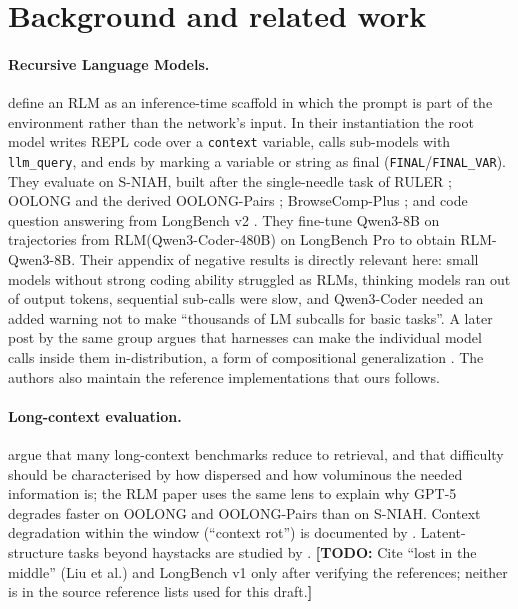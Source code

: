 \documentclass[11pt]{article}
\newcommand{\TODO}[1]{\textcolor{red!70!black}{\textbf{[TODO:} #1\textbf{]}}}
\newcommand{\code}[1]{\texttt{#1}}
\begin{document}
\section{Background and related work}
\label{sec:related}

\paragraph{Recursive Language Models.}
\citet{zhang2025rlm} define an RLM as an inference-time scaffold in which the
prompt is part of the environment rather than the network's input. In their
instantiation the root model writes REPL code over a \code{context} variable,
calls sub-models with \code{llm\_query}, and ends by marking a variable or string
as final (\code{FINAL}/\code{FINAL\_VAR}). They evaluate on S-NIAH, built after
the single-needle task of RULER \citep{hsieh2024ruler}; OOLONG and the derived
OOLONG-Pairs \citep{bertsch2025oolong}; BrowseComp-Plus
\citep{chen2025browsecompplus}; and code question answering from LongBench v2
\citep{bai2025longbenchv2}. They fine-tune Qwen3-8B \citep{yang2025qwen3} on
trajectories from RLM(Qwen3-Coder-480B) on LongBench Pro
\citep{chen2026longbenchpro} to obtain RLM-Qwen3-8B. Their appendix of negative
results is directly relevant here: small models without strong coding ability
struggled as RLMs, thinking models ran out of output tokens, sequential sub-calls
were slow, and Qwen3-Coder needed an added warning not to make ``thousands of LM
subcalls for basic tasks''. A later post by the same group argues that harnesses
can make the individual model calls inside them in-distribution, a form of
compositional generalization \citep{zhang2026harness}. The authors also maintain the
reference implementations \citep{rlmrepo,rlmminimal} that ours follows.

\paragraph{Long-context evaluation.}
\citet{goldman2025retrieval} argue that many long-context benchmarks reduce to
retrieval, and that difficulty should be characterised by how dispersed and how
voluminous the needed information is; the RLM paper uses the same lens to explain
why GPT-5 degrades faster on OOLONG and OOLONG-Pairs than on S-NIAH. Context
degradation within the window (``context rot'') is documented by
\citet{hong2025contextrot}. Latent-structure tasks beyond haystacks are studied by
\citet{vodrahalli2024michelangelo}. \TODO{Cite ``lost in the middle'' (Liu et al.)
and LongBench v1 only after verifying the references; neither is in the source
reference lists used for this draft.}
\end{document}
